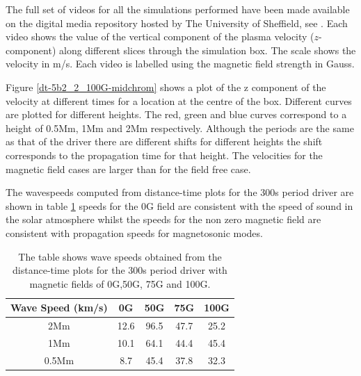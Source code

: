 \documentclass[twocolumn]{aastex62}
\begin{document}
The full set of videos for all the simulations performed have been made available on the digital media repository hosted by The University of Sheffield, see \citet{Griffiths2018}. Each video shows the value of the vertical component of the plasma velocity ($z$-component) along different slices through the simulation box. The scale shows the velocity in m/s.  Each video is labelled using the magnetic field strength in Gauss.







Figure \ref{dt-5b2_2_100G-midchrom} shows a plot of the z component of the velocity at different times for a location at the centre of the box. Different curves are plotted for different heights. The red, green and blue curves correspond to a height  of 0.5Mm, 1Mm and 2Mm respectively. Although the periods are the same as that of the driver there are different shifts for different heights the shift corresponds to the propagation time for that height. The velocities for the magnetic field cases are larger than for the field free case.


The wavespeeds computed from distance-time plots for the 300s period driver are shown in table \ref{Tablewavespeeds_300s} speeds for the 0G field are consistent with the speed of sound in the solar atmosphere whilst the speeds for the non zero magnetic field are consistent with propagation speeds for magnetosonic modes. 
\begin{table}\label{wavespeeds}
\centering
\begin{tabular}{c c c c c}
\hline
Wave Speed (km/s)   &  0G  &  50G &  75G & 100G\\
\hline
2Mm & 12.6  &   96.5       &   47.7      &  25.2     \\
\hline
1Mm & 10.1  &    64.1      &   44.4     &   45.4      \\
\hline
0.5Mm & 8.7  &   45.4      &   37.8      &   32.3    \\
\hline

\end{tabular} 
\caption{The table shows wave speeds obtained from the distance-time plots for the 300s period driver with magnetic fields of 0G,50G, 75G and 100G.}
\label{Tablewavespeeds_300s}
\end{table}
\end{document}
